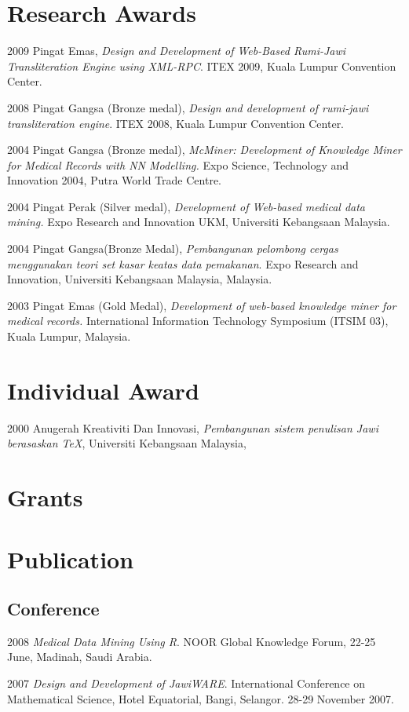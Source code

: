 \documentclass[a4paper]{article}
\newcommand\textem\textit
\begin{document}
\section{Research Awards}
\begin{CV}
\item[2009] Pingat Emas, \textit{Design and Development of Web-Based Rumi-Jawi Transliteration Engine using XML-RPC}.  ITEX 2009, Kuala Lumpur Convention Center.
\item[2008] Pingat Gangsa (Bronze medal), \textit{Design and development of rumi-jawi transliteration engine}. ITEX 2008, Kuala Lumpur Convention Center.
\item[2004] Pingat Gangsa (Bronze medal), \textit{McMiner: Development of Knowledge Miner for Medical Records with NN Modelling.} Expo Science, Technology and Innovation 2004, Putra World Trade Centre.
\item[2004] Pingat Perak (Silver medal), \textit{Development of Web-based medical data mining.} Expo Research and Innovation UKM, Universiti Kebangsaan Malaysia.
\item[2004] Pingat Gangsa(Bronze Medal), \textit{Pembangunan pelombong cergas menggunakan teori set kasar keatas data pemakanan}. Expo Research and Innovation, Universiti Kebangsaan Malaysia, Malaysia.
\item[2003] Pingat Emas (Gold Medal), \textit{Development of web-based knowledge miner for medical records.} International Information Technology Symposium (ITSIM 03), Kuala Lumpur, Malaysia.
\end{CV}

\section{Individual Award}
\begin{CV}
\item[2000] Anugerah Kreativiti Dan Innovasi, \textit{Pembangunan sistem penulisan Jawi berasaskan TeX}, Universiti Kebangsaan Malaysia, 
\end{CV}

\section{Grants}

\section{Publication}


\subsection*{Conference}
\begin{CV}
\item[2008] \textem{Medical Data Mining Using R}. NOOR Global Knowledge Forum, 22-25 June, Madinah, Saudi Arabia.
\item[2007] \textem{Design and Development of JawiWARE}. International Conference on Mathematical Science, Hotel Equatorial, Bangi, Selangor. 28-29 November 2007. 

\end{CV}
\end{document}
